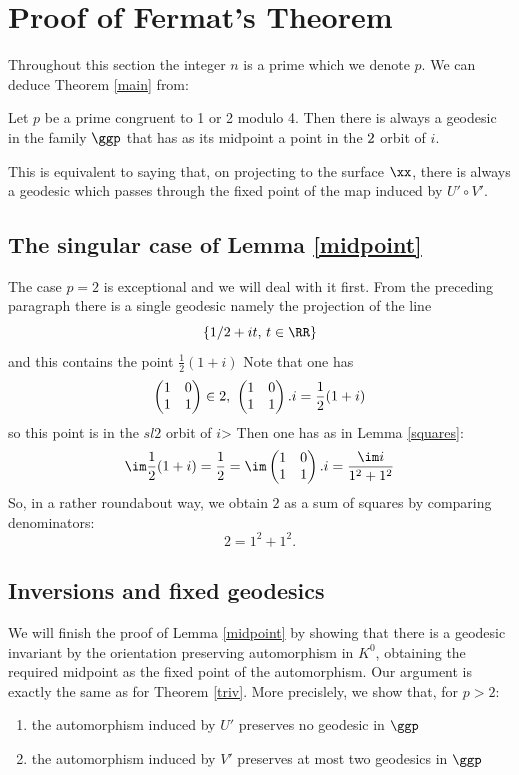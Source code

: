  
 \section{Proof of Fermat's Theorem}

Throughout this section the integer $n$ is a prime which we denote $p$.
We can deduce Theorem \ref{main} from:

\begin{lem} \label{midpoint}
Let $p$ be a prime congruent to 1 or 2 modulo 4.
Then there is always a geodesic 
in the family $\ggp$
 that has as its  midpoint a point in the $\sl2$  orbit of $i$.
\end{lem}


This is equivalent to saying that, 
on projecting to the surface  $\xx$,
 there  is always a geodesic which passes through
the  fixed point of the map induced by $U'\circ V'$.

\subsection{The singular case of Lemma \ref{midpoint}}

The case $p=2$ is exceptional and we will deal with it first.
From the preceding paragraph there is a single geodesic namely 
the projection of the line 
$$\{ 1/2 + i t,\, t \in \RR \}$$
and this contains the point  $\frac{1}{2 }(1+ i)$
Note that one has 
$$\begin{pmatrix}
1 & 0 \\
1 & 1
\end{pmatrix} \in \sl2,\,\, \begin{pmatrix}
1 & 0 \\
1 & 1
\end{pmatrix}.i  = \frac{1}{2 }(1+ i)$$
so this point is in the $sl2$ orbit of $i$>
Then one has as in Lemma \ref{squares}:
$$\im \frac{1}{2 }(1+ i) = \frac{1}{2}  =  \im \begin{pmatrix}
1 & 0 \\
1 & 1
\end{pmatrix}.i = \frac{\im i}{ 1^2 + 1^2}$$
So, in a rather roundabout way, we obtain $2$ as a sum of squares by comparing denominators:
$$2 = 1^2 + 1^2.$$




\subsection{Inversions and fixed geodesics}

We will finish the proof of  Lemma \ref{midpoint}
by showing that there is a geodesic invariant by 
the orientation preserving automorphism in $K^0$,
obtaining the required midpoint as the fixed point of the automorphism.
Our  argument is exactly  the same as for
 Theorem \ref{triv}.
 More precislely, we show that, for $p > 2$:
\begin{enumerate}
\item the automorphism induced by $U'$ preserves no geodesic in  $\ggp$
\item the automorphism induced by $V'$ preserves at most two geodesics in $\ggp$
\end{enumerate}

